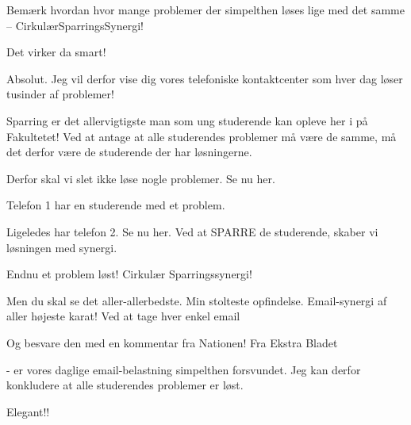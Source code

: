 \documentclass[a4paper,11pt]{article}
\begin{document}
\begin{sketch}


 Bemærk hvordan hvor mange problemer der simpelthen løses lige med det samme – CirkulærSparringsSynergi!


 Det virker da smart!

 Absolut. Jeg vil derfor vise dig vores telefoniske kontaktcenter som hver dag løser tusinder af problemer!


 Sparring er det allervigtigste man som ung studerende kan opleve her i på Fakultetet! Ved at antage at alle studerendes problemer må være de samme, må det derfor være de studerende der har løsningerne.


 Derfor skal vi slet ikke løse nogle problemer. Se nu her.



 Telefon 1 har en studerende med et problem.



 Ligeledes har telefon 2. Se nu her. Ved at SPARRE de studerende, skaber vi løsningen med synergi.



 Endnu et problem løst! Cirkulær Sparringssynergi!



 Men du skal se det aller-allerbedste. Min stolteste opfindelse. Email-synergi af aller højeste karat! Ved at tage hver enkel email 

 Og besvare den med en kommentar fra Nationen! Fra Ekstra Bladet 

 - er vores daglige email-belastning simpelthen forsvundet. Jeg kan derfor konkludere at alle studerendes problemer er løst.

 Elegant!!

\end{sketch}
\end{document}
